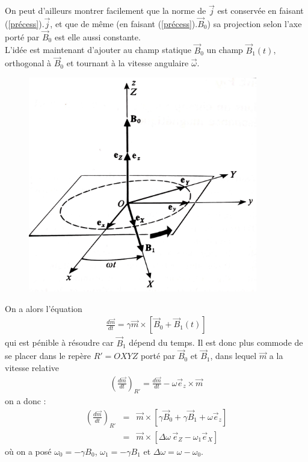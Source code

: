 \documentclass[12pt,prb,aps,epsf]{article}
\begin{document}
On peut d'ailleurs montrer facilement que la norme de $\vec{j}$ est conservée en faisant (\ref{précess})$.\vec{j}$, et que de même (en faisant (\ref{précess})$.\vec{B}_0$) sa projection selon l'axe porté par $\vec{B}_0$ est elle aussi constante.\\

L'idée est maintenant d'ajouter au champ statique $\vec{B}_0$ un champ $\vec{B}_1(t)$, orthogonal à $\vec{B}_0$ et tournant à la vitesse angulaire $\vec{\omega}$.\\
\begin{figure}[h]
	\centerline{\includegraphics[width=10cm]{champs}}
\end{figure}

On a alors 
l'équation 
\begin{eqnarray}
\frac{d\vec{m}}{dt} = \gamma \vec{m}\times [\vec{B}_0 + \vec{B}_1(t)]
\end{eqnarray}
qui est pénible à résoudre car $\vec{B}_1$ dépend du temps. Il est donc plus commode de se placer dans le repère $R' = OXYZ$ porté par $\vec{B}_0$ et $\vec{B}_1$, dans lequel $\vec{m}$ a la vitesse relative
\begin{eqnarray}
\left(\frac{d\vec{m}}{dt}\right)_{R'} = \frac{d\vec{m}}{dt} - \omega \vec{e}_z \times \vec{m}
\end{eqnarray}
on  a donc : 
\begin{eqnarray}
\left(\frac{d\vec{m}}{dt}\right)_{R'} &=& \vec{m} \times [\gamma \vec{B}_0 + \gamma \vec{B}_1 + \omega \vec{e}_z]\\
&=& \vec{m} \times [\Delta \omega \,\vec{e}_Z - \omega_1 \vec{e}_X]
\end{eqnarray}
où on a posé $\omega_0 = -\gamma B_0$, $\omega_1 = -\gamma B_1$ et $\Delta\omega = \omega - \omega_0$.\\
\end{document}
